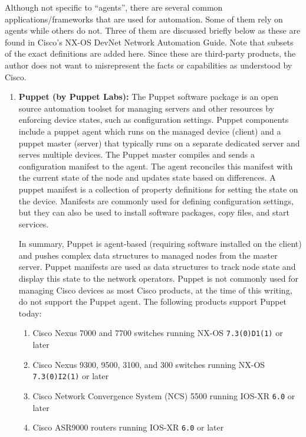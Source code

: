 Although not specific to ``agents'', there are several common
applications/frameworks that are used for automation. Some of them rely on
agents while others do not. Three of them are discussed briefly below as these
are found in Cisco’s NX-OS DevNet Network Automation Guide. Note that subsets
of the exact definitions are added here. Since these are third-party products,
the author does not want to misrepresent the facts or capabilities as
understood by Cisco.

\begin{enumerate}
  \item \textbf{Puppet (by Puppet Labs):} The Puppet software package is an
  open source automation toolset for managing servers and other resources by
  enforcing device states, such as configuration settings. Puppet components
  include a puppet agent which runs on the managed device (client) and a
  puppet master (server) that typically runs on a separate dedicated server
  and serves multiple devices. The Puppet master compiles and sends a
  configuration manifest to the agent. The agent reconciles this manifest with
  the current state of the node and updates state based on differences. A
  puppet manifest is a collection of property definitions for setting the
  state on the device. Manifests are commonly used for defining configuration
  settings, but they can also be used to install software packages, copy
  files, and start services.
  
  In summary, Puppet is agent-based (requiring software installed on the
  client) and pushes complex data structures to managed nodes from the master
  server. Puppet manifests are used as data structures to track node state and
  display this state to the network operators. Puppet is not commonly used for
  managing Cisco devices as most Cisco products, at the time of this writing,
  do not support the Puppet agent. The following products support Puppet today:

  \begin{enumerate}
    \item Cisco Nexus 7000 and 7700 switches running NX-OS \verb|7.3(0)D1(1)| or later
    \item Cisco Nexus 9300, 9500, 3100, and 300 switches running NX-OS
 	\verb|7.3(0)I2(1)| or later
    \item Cisco Network Convergence System (NCS) 5500 running IOS-XR \verb|6.0| or later
    \item Cisco ASR9000 routers running IOS-XR \verb|6.0| or later
  \end{enumerate}


\end{enumerate}

